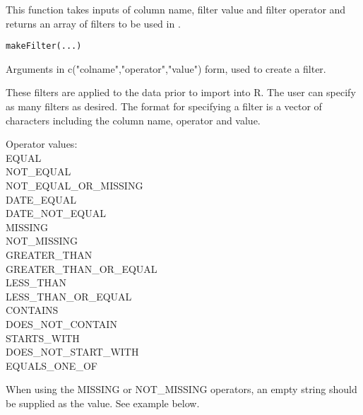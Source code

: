 \begin{Description}\relax
This function takes inputs of column name, filter value and filter operator and 
returns an array of filters to be used in .
\end{Description}
\begin{Usage}
\begin{verbatim}
makeFilter(...)
\end{verbatim}
\end{Usage}
\begin{Arguments}
\begin{ldescription}
\item[\code{...}] Arguments in c("colname","operator","value") form, used to create a filter.
\end{ldescription}
\end{Arguments}
\begin{Details}\relax
These filters are applied to the data prior to import into R. The user can specify as many 
filters as desired. The format for specifying a filter is a vector of characters including
the column name, operator and value.

Operator values:\\
EQUAL\\
NOT\_EQUAL\\ 
NOT\_EQUAL\_OR\_MISSING\\
DATE\_EQUAL\\
DATE\_NOT\_EQUAL\\
MISSING\\
NOT\_MISSING\\
GREATER\_THAN\\
GREATER\_THAN\_OR\_EQUAL\\
LESS\_THAN\\
LESS\_THAN\_OR\_EQUAL\\
CONTAINS\\
DOES\_NOT\_CONTAIN\\
STARTS\_WITH\\
DOES\_NOT\_START\_WITH\\
EQUALS\_ONE\_OF 

When using the MISSING or NOT\_MISSING operators, an empty string should be supplied as the value.
See example below.
\end{Details}
